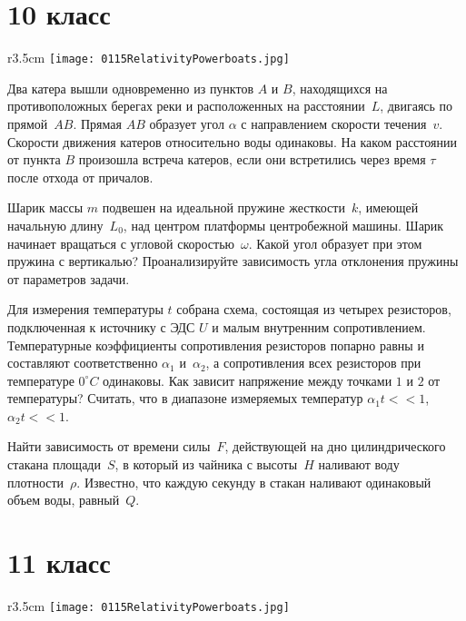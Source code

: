 \section{10 класс}

\begin{wrapfigure}{r}{3.5cm}
\texttt{[image: 0115RelativityPowerboats.jpg]}
\end{wrapfigure}

\AddProb Два катера вышли одновременно из пунктов $A$ и $B$, находящихся на противоположных берегах реки и расположенных на расстоянии~$L$, 
двигаясь по прямой~$AB$. Прямая $AB$ образует угол $\alpha$ с направлением скорости течения~$v$. Скорости движения катеров относительно воды одинаковы. 
На каком расстоянии от пункта $B$ произошла встреча катеров, если они встретились через время $\tau$ после отхода от причалов.

\AddProb Шарик массы $m$ подвешен на идеальной пружине жесткости~$k$, имеющей начальную длину~$L_0$, над центром платформы центробежной машины. 
Шарик начинает вращаться с угловой скоростью~$\omega$. Какой угол образует при этом пружина с вертикалью? 
Проанализируйте зависимость угла отклонения пружины от параметров задачи.

\AddProb Для измерения температуры $t$ собрана схема, состоящая из четырех резисторов, подключенная к источнику с ЭДС $U$ и малым внутренним сопротивлением. 
Температурные коэффициенты сопротивления резисторов попарно равны и составляют соответственно $\alpha_1$ и~$\alpha_2$, 
а сопротивления всех резисторов при температуре $0^{\circ}C$ одинаковы. Как зависит напряжение между точками $1$ и $2$ от температуры? 
Считать, что в диапазоне измеряемых температур $\alpha_1t<<1$, $\alpha_2t<<1$.

\AddProb Найти зависимость от времени силы~$F$, действующей на дно цилиндрического стакана площади~$S$, в который из чайника с высоты~$H$ 
наливают воду плотности~$\rho$. Известно, что каждую секунду в стакан наливают одинаковый объем воды, равный~$Q$.



\section{11 класс}

\begin{wrapfigure}{r}{3.5cm}
\texttt{[image: 0115RelativityPowerboats.jpg]}
\end{wrapfigure}

